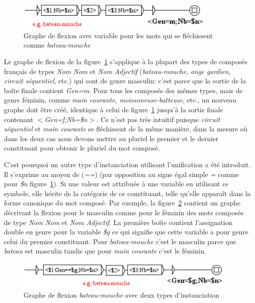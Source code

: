 \begin{figure}[!htb]
  \centering
  \includegraphics[width=10cm]{resources/img/BateauMouche2.png}
  \caption{Graphe de flexion avec variable pour les mots qui se fléchissent comme
  \emph{bateau-mouche}}
  \label{fig:BateauMouche2}
\end{figure}

\bigskip
\noindent Le graphe de flexion de la figure~\ref{fig:BateauMouche2} s'applique à la plupart des
types de composés français de types \emph{Nom Nom} et \emph{Nom Adjectif} (\emph{bateau-mouche, ange
gardien, circuit séquentiel}, etc.) qui sont de genre masculin: c'est parce que la sortie de la 
boîte finale contient \emph{Gen=m}. Pour tous les composés des mêmes types, mais de genre féminin,
comme \emph{main courante, moissoneuse-batteuse}, etc., un nouveau graphe doit être créé, identique
à celui de figure~\ref{fig:BateauMouche2} jusqu'à la sortie finale contenant
\emph{$<$Gen=f;Nb=\$n$>$}.
Ce n'est pas très intuitif puisque \emph{circuit séquentiel} et \emph{main courante} se fléchissent
de la même manière, dans la mesure où dans les deux cas nous devons mettre au pluriel le premier et
le dernier constituant pour obtenir le pluriel du mot composé.

\bigskip
\noindent C'est pourquoi un autre type d'instanciation utilisant l'unification a été introduit. 
Il s'exprime au moyen de (\emph{==}) (par opposition au signe égal simple \emph{=} comme pour
\emph{\$n} figure~\ref{fig:BateauMouche2}).
Si une valeur est attribuée à une variable en utilisant ce symbole, elle hérite de la catégorie de
ce constituant, telle qu'elle apparaît dans la forme canonique du mot composé. Par exemple, la
figure~\ref{fig:BateauMouche3} contient un graphe décrivant la flexion pour le masculin comme pour
le féminin des mots composés de type \emph{Nom Nom} et \emph{Nom Adjectif}. La première boîte
contient l'assignation double en genre pour la variable \emph{\$g} ce qui signifie que cette
variable a pour genre celui du premier constituant. Pour \emph{bateau-mouche} c'est le masculin
parce que \emph{bateau} est masculin tandis que pour \emph{main courante} c'est le féminin. 

\begin{figure}[!htb]
  \centering
  \includegraphics[width=11cm]{resources/img/BateauMouche3.png}
  \caption{Graphe de flexion \emph{bateau-mouche} avec deux types d'instanciation}
  \label{fig:BateauMouche3}
\end{figure}

